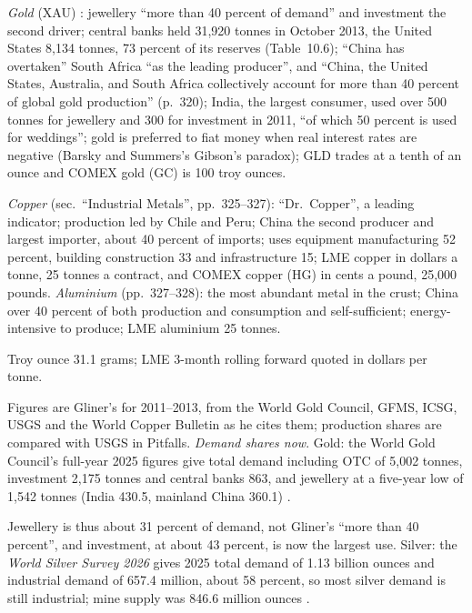 \begin{qfdefinition}\label{def:metals-markets}
 \emph{Gold} (XAU) \citep[chap.~10, sec.\ ``Precious Metals'', PDF pp.~319--321]{s7-gliner}: jewellery ``more than 40 percent of demand'' and investment the second driver; central banks held 31,920 tonnes in October 2013, the United States 8,134 tonnes, 73 percent of its reserves (Table~10.6); ``China has overtaken'' South Africa ``as the leading producer'', and ``China, the United States, Australia, and South Africa collectively account for more than 40 percent of global gold production'' (p.~320); India, the largest consumer, used over 500 tonnes for jewellery and 300 for investment in 2011, ``of which 50 percent is used for weddings''; gold is preferred to fiat money when real interest rates are negative (Barsky and Summers's Gibson's paradox); GLD trades at a tenth of an ounce and COMEX gold (GC) is 100 troy ounces.

\emph{Copper} (sec.\ ``Industrial Metals'', pp.~325--327): ``Dr.\ Copper'', a leading indicator; production led by Chile and Peru; China the second producer and largest importer, about 40 percent of imports; uses equipment manufacturing 52 percent, building construction 33 and infrastructure 15; LME copper in dollars a tonne, 25 tonnes a contract, and COMEX copper (HG) in cents a pound, 25,000 pounds. \emph{Aluminium} (pp.~327--328): the most abundant metal in the crust; China over 40 percent of both production and consumption and self-sufficient; energy-intensive to produce; LME aluminium 25 tonnes.

 Troy ounce 31.1 grams; LME 3-month rolling forward quoted in dollars per tonne.

 Figures are Gliner's for 2011--2013, from the World Gold Council, GFMS, ICSG, USGS and the World Copper Bulletin as he cites them; production shares are compared with USGS in Pitfalls. \emph{Demand shares now}. Gold: the World Gold Council's full-year 2025 figures give total demand including OTC of 5,002 tonnes, investment 2,175 tonnes and central banks 863, and jewellery at a five-year low of 1,542 tonnes (India 430.5, mainland China 360.1) \citep[press release and jewellery section, 29 January 2026]{wgc-gdt-fy2025}.

Jewellery is thus about 31 percent of demand, not Gliner's ``more than 40 percent'', and investment, at about 43 percent, is now the largest use. Silver: the \emph{World Silver Survey 2026} gives 2025 total demand of 1.13 billion ounces and industrial demand of 657.4 million, about 58 percent, so most silver demand is still industrial; mine supply was 846.6 million ounces \citep[press release of 15 April 2026]{silver-institute-wss-2026}.


\end{qfdefinition}
